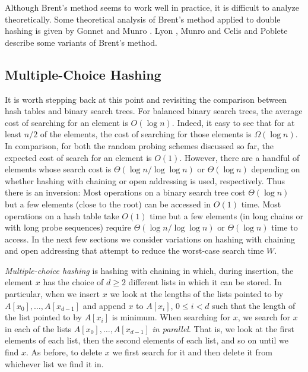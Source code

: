 Although Brent's method seems to work well in practice, it is
difficult to analyze theoretically.  Some theoretical analysis of
Brent's method applied to double hashing is given by Gonnet and Munro
\cite{gm79}.  Lyon \cite{lyon78}, Munro and Celis \cite{mc99} and
Poblete \cite{p77} describe some variants of Brent's method.


\subsection{Multiple-Choice Hashing}
\label{hash:sec:multiplechoice}

It is worth stepping back at this point and revisiting the comparison
between hash tables and binary search trees.  For balanced binary
search trees, the average cost of searching for an element is $O(\log
n)$.  Indeed, it easy to see that for at least $n/2$ of the elements,
the cost of searching for those elements is $\Omega(\log n)$.  In
comparison, for both the random probing schemes discussed so far, the
expected cost of search for an element is $O(1)$.  However, there are
a handful of elements whose search cost is $\Theta(\log n/\log \log
n)$ or $\Theta(\log n)$ depending on whether hashing with chaining or
open addressing is used, respectively.  Thus there is an inversion:
Most operations on a binary search tree cost $\Theta(\log n)$ but a
few elements (close to the root) can be accessed in $O(1)$ time.  Most
operations on a hash table take $O(1)$ time but a few elements (in long
chains or with long probe sequences) require $\Theta(\log n/\log\log
n)$ or $\Theta(\log n)$ time to access.  In the next few sections we
consider variations on hashing with chaining and open addressing that
attempt to reduce the worst-case search time $W$.

\emph{Multiple-choice hashing} is hashing with chaining in which,
during insertion, the element $x$ has the choice of $d\ge 2$ different
lists in which it can be stored.  In particular, when we insert $x$ we
look at the lengths of the lists pointed to by
$A[x_0],\ldots,A[x_{d-1}]$ and append $x$ to $A[x_i]$, $0\le i< d$
such that the length of the list pointed to by $A[x_i]$ is minimum.
When searching for $x$, we search for $x$ in each of the lists
$A[x_0],\ldots,A[x_{d-1}]$ \emph{in parallel}.  That is, we look at
the first elements of each list, then the second elements of each
list, and so on until we find $x$.  As before, to delete $x$  we first
search for it and then delete it from whichever list we find it in.  

